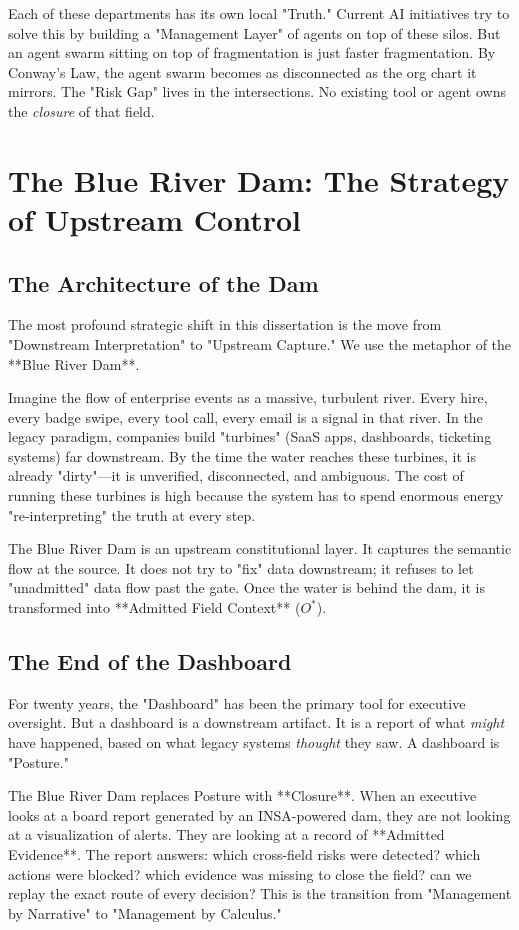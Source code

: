 \documentclass[12pt,a4paper,oneside]{book}
\begin{document}
Each of these departments has its own local "Truth." Current AI initiatives try to solve this by building a "Management Layer" of agents on top of these silos. But an agent swarm sitting on top of fragmentation is just faster fragmentation. By Conway’s Law, the agent swarm becomes as disconnected as the org chart it mirrors. The "Risk Gap" lives in the intersections. No existing tool or agent owns the \textit{closure} of that field.

\chapter{The Blue River Dam: The Strategy of Upstream Control}

\section{The Architecture of the Dam}
The most profound strategic shift in this dissertation is the move from "Downstream Interpretation" to "Upstream Capture." We use the metaphor of the **Blue River Dam**.

Imagine the flow of enterprise events as a massive, turbulent river. Every hire, every badge swipe, every tool call, every email is a signal in that river. In the legacy paradigm, companies build "turbines" (SaaS apps, dashboards, ticketing systems) far downstream. By the time the water reaches these turbines, it is already "dirty"---it is unverified, disconnected, and ambiguous. The cost of running these turbines is high because the system has to spend enormous energy "re-interpreting" the truth at every step.

The Blue River Dam is an upstream constitutional layer. It captures the semantic flow at the source. It does not try to "fix" data downstream; it refuses to let "unadmitted" data flow past the gate. Once the water is behind the dam, it is transformed into **Admitted Field Context** ($O^*$). 

\section{The End of the Dashboard}
For twenty years, the "Dashboard" has been the primary tool for executive oversight. But a dashboard is a downstream artifact. It is a report of what \textit{might} have happened, based on what legacy systems \textit{thought} they saw. A dashboard is "Posture." 

The Blue River Dam replaces Posture with **Closure**. When an executive looks at a board report generated by an INSA-powered dam, they are not looking at a visualization of alerts. They are looking at a record of **Admitted Evidence**. The report answers: which cross-field risks were detected? which actions were blocked? which evidence was missing to close the field? can we replay the exact route of every decision? This is the transition from "Management by Narrative" to "Management by Calculus."
\end{document}
